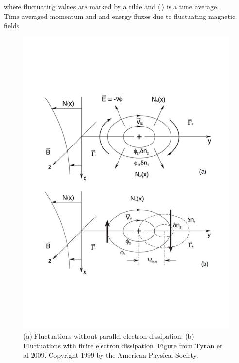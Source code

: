 \indent where fluctuating values are marked by a tilde and $\langle ~ \rangle$ is a time average. \\

\noindent
Time averaged momentum and and energy fluxes due to fluctuating magnetic fields \cite{tynan}



\begin{figure}[h!]
\centering
  \includegraphics[scale=.5]{figures/turbulencefigure}
  \caption*{\small (a) Fluctuations without parallel electron dissipation. (b) Fluctuations with finite electron dissipation. Figure from Tynan et al 2009. Copyright 1999 by the American Physical Society.}
\end{figure}

